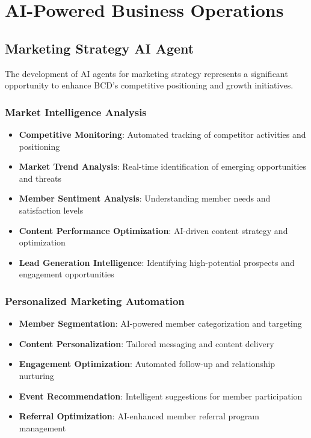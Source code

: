 \section{AI-Powered Business Operations}

\subsection{Marketing Strategy AI Agent}
The development of AI agents for marketing strategy represents a significant opportunity to enhance BCD's competitive positioning and growth initiatives.

\subsubsection{Market Intelligence Analysis}
\begin{itemize}
    \item \textbf{Competitive Monitoring}: Automated tracking of competitor activities and positioning
    \item \textbf{Market Trend Analysis}: Real-time identification of emerging opportunities and threats
    \item \textbf{Member Sentiment Analysis}: Understanding member needs and satisfaction levels
    \item \textbf{Content Performance Optimization}: AI-driven content strategy and optimization
    \item \textbf{Lead Generation Intelligence}: Identifying high-potential prospects and engagement opportunities
\end{itemize}

\subsubsection{Personalized Marketing Automation}
\begin{itemize}
    \item \textbf{Member Segmentation}: AI-powered member categorization and targeting
    \item \textbf{Content Personalization}: Tailored messaging and content delivery
    \item \textbf{Engagement Optimization}: Automated follow-up and relationship nurturing
    \item \textbf{Event Recommendation}: Intelligent suggestions for member participation
    \item \textbf{Referral Optimization}: AI-enhanced member referral program management
\end{itemize}


